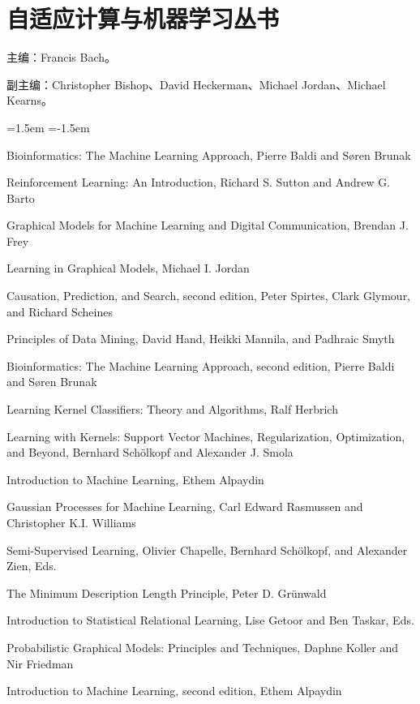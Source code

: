 \chapter*{自适应计算与机器学习丛书}
主编：Francis Bach。\par
副主编：Christopher Bishop、David Heckerman、Michael Jordan、Michael Kearns。\par
\begingroup
\small\raggedright
\begin{list}{}{\leftmargin=1.5em
 \itemindent=-1.5em\parsep=0pt\itemsep=4pt}
\item Bioinformatics: The Machine Learning Approach, Pierre Baldi and Søren Brunak
\item Reinforcement Learning: An Introduction, Richard S. Sutton and Andrew G. Barto
\item Graphical Models for Machine Learning and Digital Communication, Brendan J. Frey
\item Learning in Graphical Models, Michael I. Jordan
\item Causation, Prediction, and Search, second edition, Peter Spirtes, Clark Glymour, and Richard Scheines
\item Principles of Data Mining, David Hand, Heikki Mannila, and Padhraic Smyth
\item Bioinformatics: The Machine Learning Approach, second edition, Pierre Baldi and Søren Brunak
\item Learning Kernel Classifiers: Theory and Algorithms, Ralf Herbrich
\item Learning with Kernels: Support Vector Machines, Regularization, Optimization, and Beyond, Bernhard Schölkopf and Alexander J. Smola
\item Introduction to Machine Learning, Ethem Alpaydin
\item Gaussian Processes for Machine Learning, Carl Edward Rasmussen and Christopher K.I. Williams
\item Semi-Supervised Learning, Olivier Chapelle, Bernhard Schölkopf, and Alexander Zien, Eds.
\item The Minimum Description Length Principle, Peter D. Grünwald
\item Introduction to Statistical Relational Learning, Lise Getoor and Ben Taskar, Eds.
\item Probabilistic Graphical Models: Principles and Techniques, Daphne Koller and Nir Friedman
\item Introduction to Machine Learning, second edition, Ethem Alpaydin

\end{list}
